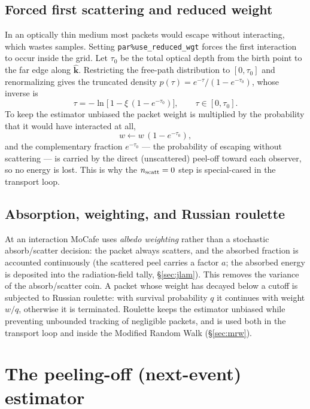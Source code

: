 \documentclass[english,a4paper]{kiseon_memo}
\newcommand{\khat}{\hat{\mathbf k}}
\newcommand{\pp}[1]{\texttt{par\%#1}}
\begin{document}
\subsection{Forced first scattering and reduced weight}
In an optically thin medium most packets would escape without interacting,
which wastes samples.  Setting \pp{use\_reduced\_wgt} forces the first
interaction to occur inside the grid.  Let $\tau_0$ be the total optical depth
from the birth point to the far edge along $\khat$.  Restricting the free-path
distribution to $[0,\tau_0]$ and renormalizing gives the truncated density
$p(\tau)=e^{-\tau}/(1-e^{-\tau_0})$, whose inverse is
\begin{equation}
  \tau = -\ln\!\big[\,1-\xi\,(1-e^{-\tau_0})\big],\qquad \tau\in[0,\tau_0].
\end{equation}
To keep the estimator unbiased the packet weight is multiplied by the
probability that it would have interacted at all,
\begin{equation}
  w \leftarrow w\,(1-e^{-\tau_0}),
\end{equation}
and the complementary fraction $e^{-\tau_0}$ --- the probability of escaping
without scattering --- is carried by the direct (unscattered) peel-off toward
each observer, so no energy is lost.  This is why the $n_{\rm scatt}=0$ step is
special-cased in the transport loop.

\subsection{Absorption, weighting, and Russian roulette}
At an interaction MoCafe uses \emph{albedo weighting} rather than a stochastic
absorb/scatter decision: the packet always scatters, and the absorbed fraction
is accounted continuously (the scattered peel carries a factor $a$; the absorbed
energy is deposited into the radiation-field tally, \S\ref{sec:jlam}).  This
removes the variance of the absorb/scatter coin.  A packet whose weight has
decayed below a cutoff is subjected to Russian roulette: with survival
probability $q$ it continues with weight $w/q$, otherwise it is terminated.
Roulette keeps the estimator unbiased while preventing unbounded tracking of
negligible packets, and is used both in the transport loop and inside the
Modified Random Walk (\S\ref{sec:mrw}).

\section{The peeling-off (next-event) estimator}
\end{document}
